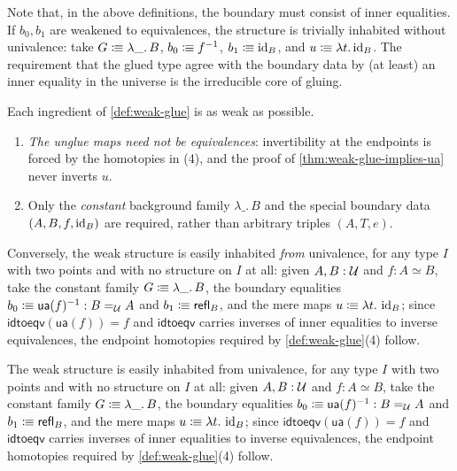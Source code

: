 Note that, in the above definitions, the boundary must consist of inner equalities.
If $b_0,b_1$ are weakened to equivalences, the structure is trivially inhabited
without univalence: take $G\mathrel{\vcentcolon\mspace{-1mu}\equiv}\lambda\_.\,B$,
$b_0\mathrel{\vcentcolon\mspace{-1mu}\equiv} f^{-1}$, $b_1\mathrel{\vcentcolon\mspace{-1mu}\equiv}\operatorname{id}_B$, and
$u\mathrel{\vcentcolon\mspace{-1mu}\equiv}\lambda t.\operatorname{id}_B$.
The requirement that the glued type
agree with the boundary data by (at least) an inner equality in the universe is the
irreducible core of gluing.



\begin{longversion}
\begin{remark}\label{rem:weak-glue-sharp}
	Each ingredient of \cref{def:weak-glue} is as weak as possible.
	\begin{enumerate}[noitemsep]
		\item \emph{The unglue maps need not be equivalences}: invertibility at
		the endpoints is forced by the homotopies in (4), and the proof of
		\cref{thm:weak-glue-implies-ua} never inverts $u$.
		\item Only the \emph{constant} background family $\lambda\_.\,B$ and the
		special boundary data $(A,B,f,\operatorname{id}_B)$ are required, rather than
		arbitrary triples $(A,T,e)$.
	\end{enumerate}
	Conversely, the weak structure is easily inhabited \emph{from}
	univalence, for any type $I$ with two points and with no structure on
	$I$ at all: given $A,B:\mathcal{U}$ and $f:A\simeq B$, take the constant family
	$G\mathrel{\vcentcolon\mspace{-1mu}\equiv}\lambda\_.\,B$, the boundary equalities
	$b_0\mathrel{\vcentcolon\mspace{-1mu}\equiv}\mathsf{ua}(f)^{-1}:B=_{\mathcal{U}} A$ and
	$b_1\mathrel{\vcentcolon\mspace{-1mu}\equiv}\mathsf{refl}_B$, and the mere maps
	$u\mathrel{\vcentcolon\mspace{-1mu}\equiv}\lambda t.\,\operatorname{id}_B$; since
	$\mathsf{idtoeqv}(\mathsf{ua}(f))=f$ and $\mathsf{idtoeqv}$ carries
	inverses of inner equalities to inverse equivalences, the endpoint homotopies required
	by \cref{def:weak-glue}(4) follow.
\end{remark}
\end{longversion}

\begin{remark}\label{lem:ua-gives-weak-glue}
The weak structure is easily inhabited from
univalence, for any type $I$ with two points and with no structure on
$I$ at all: given $A,B:\mathcal{U}$ and $f:A\simeq B$, take the constant family
$G\mathrel{\vcentcolon\mspace{-1mu}\equiv}\lambda\_.\,B$, the boundary equalities
$b_0\mathrel{\vcentcolon\mspace{-1mu}\equiv}\mathsf{ua}(f)^{-1}:B=_{\mathcal{U}} A$ and
$b_1\mathrel{\vcentcolon\mspace{-1mu}\equiv}\mathsf{refl}_B$, and the mere maps
$u\mathrel{\vcentcolon\mspace{-1mu}\equiv}\lambda t.\,\operatorname{id}_B$; since
$\mathsf{idtoeqv}(\mathsf{ua}(f))=f$ and $\mathsf{idtoeqv}$ carries
inverses of inner equalities to inverse equivalences, the endpoint homotopies required
by \cref{def:weak-glue}(4) follow.
\end{remark}

